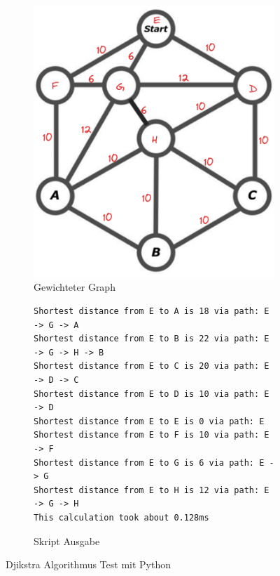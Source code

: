 \begin{figure}[H]
\begin{subfigure}{0.275\textwidth}
\includegraphics[width=0.95\linewidth]{img/graph_with_weighted_edges.png} 
\caption{Gewichteter Graph}
\label{fig:weighted-graph}
\end{subfigure}
\begin{subfigure}{0.720\textwidth}
\begin{footnotesize}
\begin{verbatim}
Shortest distance from E to A is 18 via path: E -> G -> A
Shortest distance from E to B is 22 via path: E -> G -> H -> B
Shortest distance from E to C is 20 via path: E -> D -> C
Shortest distance from E to D is 10 via path: E -> D
Shortest distance from E to E is 0 via path: E
Shortest distance from E to F is 10 via path: E -> F
Shortest distance from E to G is 6 via path: E -> G
Shortest distance from E to H is 12 via path: E -> G -> H
This calculation took about 0.128ms
\end{verbatim}
\end{footnotesize}
\caption{Skript Ausgabe}
\label{fig:dijkstra-test-skript-output}
\end{subfigure}

\caption{Djikstra Algorithmus Test mit Python}
\label{fig:dijkstra-test-output}
\end{figure}


